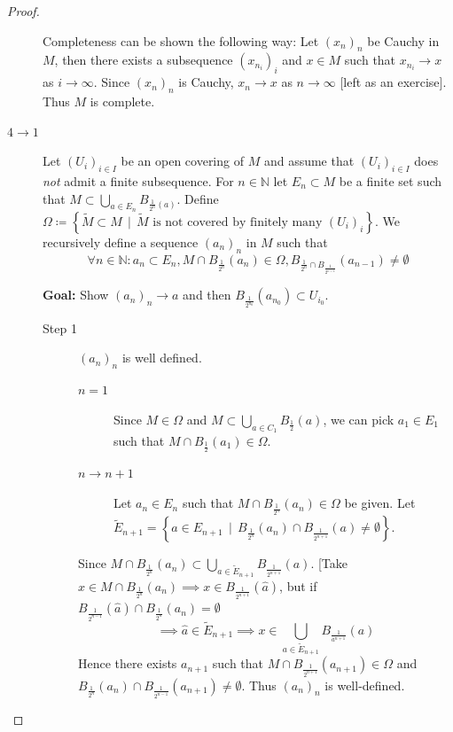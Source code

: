 \documentclass{article}
\numberwithin{lecref}{section}
\newcommand{\SetDef}[2]{\left\{#1\,\mid\,#2\right\}}
\begin{document}
\begin{proof}
\begin{description}
			Completeness can be shown the following way:
			Let $(x_n)_n$ be Cauchy in $M$, then there exists a subsequence $(x_{n_i})_i$ and $x \in M$ such that $x_{n_i} \to x$ as $i \to \infty$.
			Since $(x_n)_n$ is Cauchy, $x_n \to x$ as $n \to \infty$ [left as an exercise]. Thus $M$ is complete.
		\item[$4 \to 1$]
			Let $(U_i)_{i \in I}$ be an open covering of $M$ and assume that $(U_i)_{i \in I}$ does \emph{not} admit a finite subsequence.
			For $n \in \mathbb N$ let $E_n \subset M$ be a finite set such that $M \subset \bigcup_{a \in E_n} B_{\frac1{2^n}(a)}$.
			Define $\Omega \coloneqq \SetDef{\tilde M \subset M}{\tilde M \text{ is not covered by finitely many } (U_i)_i}$.
			We recursively define a sequence $(a_n)_n$ in $M$ such that 
			\[ \forall n \in \mathbb N: a_n \subset E_n, M \cap B_{\frac1{2^n}}(a_n) \in \Omega, B_{\frac{1}{2^n} \cap B_{\frac{1}{2^{n-1}}}}(a_{n-1}) \neq \emptyset \]

			\textbf{Goal:} Show $(a_n)_n \to a$ and then $B_{\frac{1}{2^{n_0}}}(a_{n_0}) \subset U_{i_0}$.

			\begin{description}
				\item[Step 1]
					$(a_n)_n$ is well defined.
					\begin{description}
						\item[$n=1$] Since $M \in \Omega$ and $M \subset \bigcup_{a \in C_1} B_{\frac12}(a)$, we can pick $a_1 \in E_1$ such that $M \cap B_{\frac12}(a_1) \in \Omega$.
						\item[$n \to n+1$]
							Let $a_n \in E_n$ such that $M \cap B_{\frac1{2^n}}(a_n) \in \Omega$ be given.
							Let $\tilde E_{n+1} = \SetDef{a \in E_{n+1}}{B_{\frac1{2^n}}(a_n) \cap B_{\frac1{2^{n+1}}}(a) \neq \emptyset}$.
					\end{description}

					Since $M \cap B_{\frac1{2^n}}(a_n) \subset \bigcup_{a \in \tilde E_{n+1}} B_{\frac{1}{2^{n+1}}}(a)$.
					[Take $x \in M \cap B_{\frac1{2^n}}(a_n) \implies x \in B_{\frac{1}{2^{n+1}}}(\hat a)$, but if $B_{\frac1{2^{n-1}}}(\hat a) \cap B_{\frac1{2^n}}(a_n) = \emptyset$
					\[ \implies \hat a \in \tilde E_{n+1} \implies x \in \bigcup_{a \in \tilde E_{n+1}} B_{\frac{1}{a^{n+1}}}(a) \]
					Hence there exists $a_{n+1}$ such that $M \cap B_{\frac{1}{2^{n+1}}}(a_{n+1}) \in \Omega$ and $B_{\frac{1}{2^n}}(a_n) \cap B_{\frac{1}{2^{n-1}}}(a_{n+1}) \neq \emptyset$.
					Thus $(a_n)_n$ is well-defined.


\end{description}
\end{description}
\end{proof}
\end{document}
